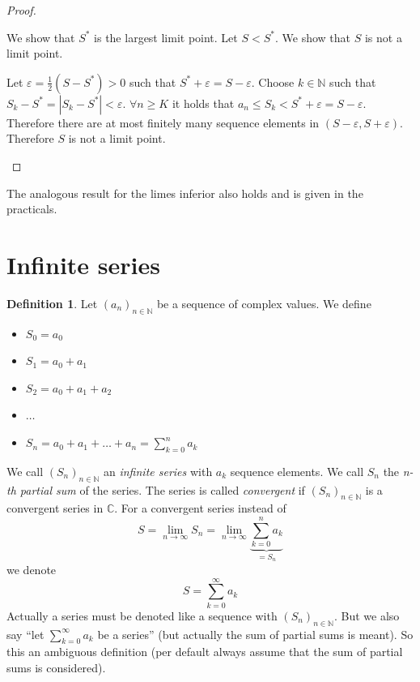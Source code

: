 \documentclass[a4paper,landscape,twocolumn]{article}
\theoremstyle{definition}
\newtheorem{defi}{Definition}
\newcommand\abs[1]{\left|#1\right|}
\newcommand\seq[1]{{\left(#1\right)}_{n \in \mathbb N}}
\begin{document}
\begin{proof}
\begin{description}
      We show that $S^*$ is the largest limit point.
      Let $S < S^*$. We show that $S$ is not a limit point.

      Let $\varepsilon = \frac12(S - S^*) > 0$ such that $S^* + \varepsilon = S - \varepsilon$.
      Choose $k \in \mathbb N$ such that $S_k - S^* = \abs{S_k - S^*} < \varepsilon$.
      $\forall n \geq K$ it holds that $a_n \leq S_k < S^* + \varepsilon = S - \varepsilon$.
      Therefore there are at most finitely many sequence elements in $(S - \varepsilon, S + \varepsilon)$.
      Therefore $S$ is not a limit point.
  \end{description}
\end{proof}

The analogous result for the limes inferior also holds and is given in the practicals.

\section{Infinite series}
\begin{defi}
  Let $\seq{a_n}$ be a sequence of complex values. We define
  \begin{itemize}
    \item $S_0 = a_0$
    \item $S_1 = a_0 + a_1$
    \item $S_2 = a_0 + a_1 + a_2$
    \item $\dots$
    \item $S_n = a_0 + a_1 + \dots + a_n = \sum_{k=0}^n a_k$
  \end{itemize}
  We call $\seq{S_n}$ an \emph{infinite series} with $a_k$ sequence elements.
  We call $S_n$ the \emph{n-th partial sum} of the series.
  The series is called \emph{convergent} if $\seq{S_n}$ is a convergent series in $\mathbb C$.
  For a convergent series instead of
  \[ S = \lim_{n\to\infty} S_n = \lim_{n\to\infty} \underbrace{\sum_{k=0}^n a_k}_{= S_n} \]
  we denote
  \[ S = \sum_{k = 0}^\infty a_k \]
  Actually a series must be denoted like a sequence with $\seq{S_n}$.
  But we also say \enquote{let $\sum_{k=0}^\infty a_k$ be a series}
  (but actually the sum of partial sums is meant).
  So this an ambiguous definition (per default always assume that the sum of partial sums is considered).
\end{defi}
\end{document}
